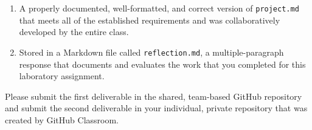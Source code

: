 \documentclass[11pt]{article}
\newcommand{\project}{\lstinline{project.md}}
\newcommand{\reflection}{\lstinline{reflection.md}}
\begin{document}
\begin{enumerate}

\setlength{\itemsep}{-.01in}

\item A properly documented, well-formatted, and correct version of \project{}
  that meets all of the established requirements and was collaboratively
  developed by the entire class.

\item Stored in a Markdown file called \reflection{}, a multiple-paragraph
  response that documents and evaluates the work that you completed for this
  laboratory assignment.

\end{enumerate}

\noindent Please submit the first deliverable in the shared, team-based GitHub
repository and submit the second deliverable in your individual, private
repository that was created by GitHub Classroom.

\end{document}
